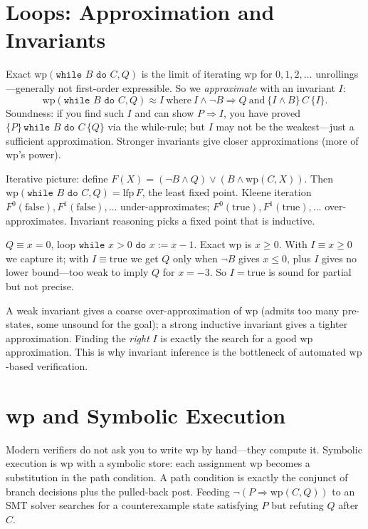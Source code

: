 \section{Loops: Approximation and Invariants}
\label{sec:wp-loops}
Exact $\text{wp}(\texttt{while }B\texttt{ do }C, Q)$ is the limit of iterating $\text{wp}$ for $0,1,2,\dots$ unrollings—generally not first-order expressible. So we \emph{approximate} with an invariant $I$:
\[
\text{wp}(\texttt{while }B\texttt{ do }C, Q) \approx I\ \text{where}\ I\land\neg B\Rightarrow Q\ \text{and}\ \{I\land B\}\,C\,\{I\}.
\]
Soundness: if you find such $I$ and can show $P\Rightarrow I$, you have proved $\{P\}\,\texttt{while }B\texttt{ do }C\,\{Q\}$ via the while-rule; but $I$ may not be the weakest—just a sufficient approximation. Stronger invariants give closer approximations (more of $\text{wp}$'s power).

Iterative picture: define $F(X)= (\neg B\land Q)\lor(B\land\text{wp}(C,X))$. Then $\text{wp}(\texttt{while }B\texttt{ do }C,Q)=\text{lfp}\,F$, the least fixed point. Kleene iteration $F^0(\text{false}), F^1(\text{false}),\dots$ under-approximates; $F^0(\text{true}),F^1(\text{true}),\dots$ over-approximates. Invariant reasoning picks a fixed point that is inductive.

\begin{example}
$Q\equiv x=0$, loop $\texttt{while }x>0\texttt{ do }x:=x-1$. Exact $\text{wp}$ is $x\ge0$. With $I\equiv x\ge0$ we capture it; with $I\equiv\text{true}$ we get $Q$ only when $\neg B$ gives $x\le0$, plus $I$ gives no lower bound—too weak to imply $Q$ for $x=-3$. So $I=\text{true}$ is sound for partial but not precise.
\end{example}

\begin{remark}[Invariant choice = wp approximation quality]
A weak invariant gives a coarse over-approximation of $\text{wp}$ (admits too many pre-states, some unsound for the goal); a strong inductive invariant gives a tighter approximation. Finding the \emph{right} $I$ is exactly the search for a good $\text{wp}$ approximation. This is why invariant inference is the bottleneck of automated $\text{wp}$-based verification.
\end{remark}

\section{wp and Symbolic Execution}
\label{sec:symexec}
Modern verifiers do not ask you to write $\text{wp}$ by hand—they compute it. Symbolic execution is $\text{wp}$ with a symbolic store: each assignment $\text{wp}$ becomes a substitution in the path condition. A path condition is exactly the conjunct of branch decisions plus the pulled-back post. Feeding $\neg(P\Rightarrow\text{wp}(C,Q))$ to an SMT solver searches for a counterexample state satisfying $P$ but refuting $Q$ after $C$.

